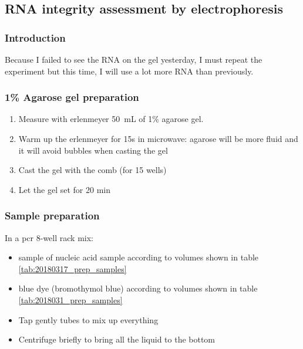 \subsection{RNA integrity assessment by electrophoresis}
\label{task:20180317_cj0}


\subsubsection{Introduction}

Because I failed to see the RNA on the gel yesterday, I must repeat the experiment but this time, I will use a lot more RNA than previously.

\subsubsection{1\% Agarose gel preparation}

\begin{enumerate}
\item Measure with erlenmeyer 50~mL of 1\% agarose gel.
\item Warm up the erlenmeyer for 15s in microwave: agarose will be more fluid and it will avoid bubbles when casting the gel
\item Cast the gel with the comb (for 15 wells)
\item Let the gel set for 20 min
\end{enumerate}

\subsubsection{Sample preparation}

In a \gls{pcr} 8-well rack mix:
\begin{itemize}
\item sample of nucleic acid sample according to volumes shown in table \ref{tab:20180317_prep_samples}
\item blue dye (bromothymol blue) according to volumes shown in table \ref{tab:2018031_prep_samples}
\item Tap gently tubes to mix up everything
\item Centrifuge briefly to bring all the liquid to the bottom
\end{itemize}

